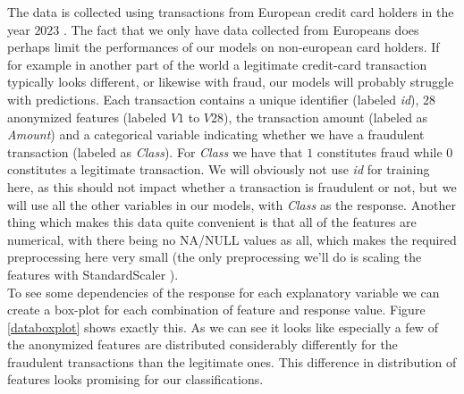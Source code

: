 \documentclass{article}
\begin{document}
The data is collected using transactions from European credit card holders in
the year $2023$ \cite{kaggleccdata}. The fact that we only have data collected
from Europeans does perhaps limit the performances of our models on non-european
card holders. If for example in another part of the world a legitimate
credit-card transaction typically looks different, or likewise with fraud, our
models will probably struggle with predictions.  Each transaction contains a
unique identifier (labeled \textit{id}), $28$ anonymized features (labeled
$\mathit{V1}$ to $\mathit{V28}$), the transaction amount (labeled as
\textit{Amount}) and a categorical variable indicating whether we have a
fraudulent transaction (labeled as \textit{Class}). For \textit{Class} we have
that $1$ constitutes fraud while $0$ constitutes a legitimate transaction. We
will obviously not use \textit{id} for training here, as this should not impact
whether a transaction is fraudulent or not, but we will use all the other
variables in our models, with \textit{Class} as the response. Another thing
which makes this data quite convenient is that all of the features are
numerical, with there being no NA/NULL values as all, which makes the required
preprocessing here very small (the only preprocessing we'll do is scaling the
features with StandardScaler \cite{sklearnstandardscaler}).
\\

To see some dependencies of the response for each explanatory variable we can
create a box-plot for each combination of feature and response value. Figure
\ref{databoxplot} shows exactly this. As we can see it looks like especially a
few of the anonymized features are distributed considerably differently for the
fraudulent transactions than the legitimate ones.  This difference in
distribution of features looks promising for our classifications.
\end{document}
